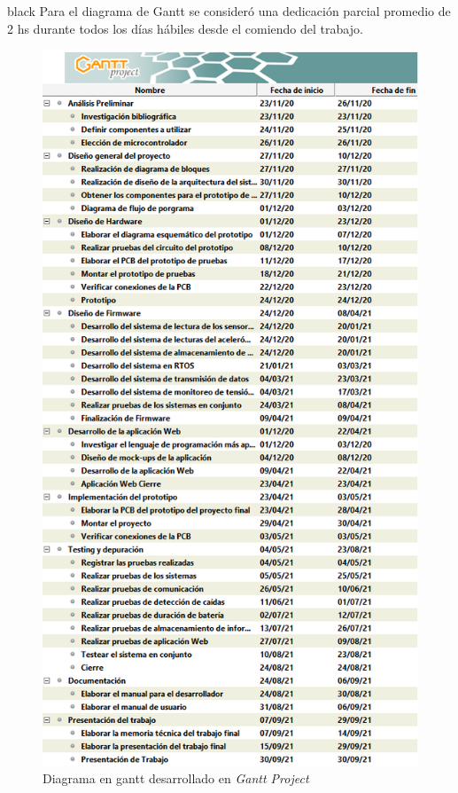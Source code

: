 \documentclass[11pt]{charter}
\begin{document}
\begin{consigna}{black}
Para el diagrama de Gantt se consideró una dedicación parcial promedio de 2 hs durante todos los días hábiles desde el comiendo del trabajo.
\begin{figure}[htpb]

\centering 
\includegraphics[width=.8\textwidth]{./Figuras/DiagramaGantt_Nombres.png}
\caption{Diagrama en gantt desarrollado en \textit{Gantt Project}}
\label{fig:gantt1}
\end{figure}
\vspace{-15px}
\begin{figure}[htpb]
\centering 
\centering 

\end{figure}
\end{consigna}
\end{document}
